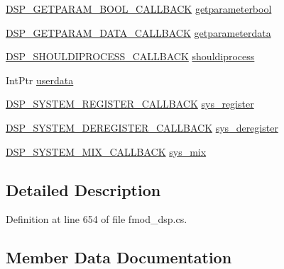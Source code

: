 \begin{DoxyCompactItemize}
\item 
\hyperlink{namespace_f_m_o_d_a33838e3f6ccd4391d489471a6c8f6759}{D\+S\+P\+\_\+\+G\+E\+T\+P\+A\+R\+A\+M\+\_\+\+B\+O\+O\+L\+\_\+\+C\+A\+L\+L\+B\+A\+CK} \hyperlink{struct_f_m_o_d_1_1_d_s_p___d_e_s_c_r_i_p_t_i_o_n_a54435b1d7b85b249161096613b040f0f}{getparameterbool}
\item 
\hyperlink{namespace_f_m_o_d_a2c3e74855c682c2e23061f6a5e45cab0}{D\+S\+P\+\_\+\+G\+E\+T\+P\+A\+R\+A\+M\+\_\+\+D\+A\+T\+A\+\_\+\+C\+A\+L\+L\+B\+A\+CK} \hyperlink{struct_f_m_o_d_1_1_d_s_p___d_e_s_c_r_i_p_t_i_o_n_a931eccdcc52cea0050079b4f1e5d0686}{getparameterdata}
\item 
\hyperlink{namespace_f_m_o_d_a20f7f3a049e0fa5d089b0cfd44b348b5}{D\+S\+P\+\_\+\+S\+H\+O\+U\+L\+D\+I\+P\+R\+O\+C\+E\+S\+S\+\_\+\+C\+A\+L\+L\+B\+A\+CK} \hyperlink{struct_f_m_o_d_1_1_d_s_p___d_e_s_c_r_i_p_t_i_o_n_a68addc9478148448b48a75506e7f641c}{shouldiprocess}
\item 
Int\+Ptr \hyperlink{struct_f_m_o_d_1_1_d_s_p___d_e_s_c_r_i_p_t_i_o_n_a4e4c7e850ffbff10967177a70caf003a}{userdata}
\item 
\hyperlink{namespace_f_m_o_d_a4457427eed494a3d957f3d99d9639ef1}{D\+S\+P\+\_\+\+S\+Y\+S\+T\+E\+M\+\_\+\+R\+E\+G\+I\+S\+T\+E\+R\+\_\+\+C\+A\+L\+L\+B\+A\+CK} \hyperlink{struct_f_m_o_d_1_1_d_s_p___d_e_s_c_r_i_p_t_i_o_n_a1fb3c01fd90f75887c39bc6248b4092f}{sys\+\_\+register}
\item 
\hyperlink{namespace_f_m_o_d_a39b15dd04002fdbc990ceeedc0a86080}{D\+S\+P\+\_\+\+S\+Y\+S\+T\+E\+M\+\_\+\+D\+E\+R\+E\+G\+I\+S\+T\+E\+R\+\_\+\+C\+A\+L\+L\+B\+A\+CK} \hyperlink{struct_f_m_o_d_1_1_d_s_p___d_e_s_c_r_i_p_t_i_o_n_afeec2f04989361bea93048523cd29995}{sys\+\_\+deregister}
\item 
\hyperlink{namespace_f_m_o_d_a641bcff8485031584c905220518b4e7c}{D\+S\+P\+\_\+\+S\+Y\+S\+T\+E\+M\+\_\+\+M\+I\+X\+\_\+\+C\+A\+L\+L\+B\+A\+CK} \hyperlink{struct_f_m_o_d_1_1_d_s_p___d_e_s_c_r_i_p_t_i_o_n_a57f797e4315d62beab43695b5bb935b1}{sys\+\_\+mix}
\end{DoxyCompactItemize}


\subsection{Detailed Description}


Definition at line 654 of file fmod\+\_\+dsp.\+cs.



\subsection{Member Data Documentation}
\mbox{\label{struct_f_m_o_d_1_1_d_s_p___d_e_s_c_r_i_p_t_i_o_n_ab986a42e18ad51980a73501234ab3b22}} 
